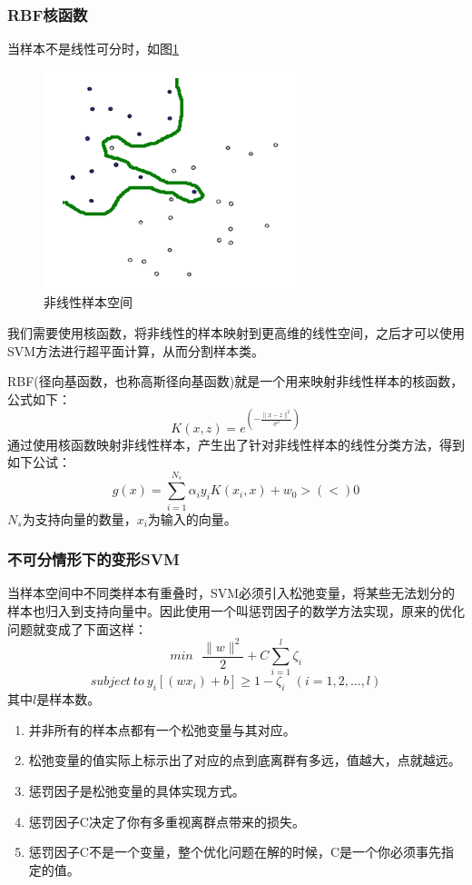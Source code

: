 \documentclass[UTF8, twocolumn ]{ctexart}
\begin{document}
\subsubsection{RBF核函数}
当样本不是线性可分时，如图\ref{fig:no8}
\begin{figure}[!ht]\centering
  \includegraphics[keepaspectratio, scale=1]{no8.png}
  \caption{非线性样本空间\label{fig:no8}} 
\end{figure}
我们需要使用核函数，将非线性的样本映射到更高维的线性空间，之后才可以使用SVM方法进行超平面计算，从而分割样本类。
\par
RBF(径向基函数，也称高斯径向基函数)就是一个用来映射非线性样本的核函数，公式如下：
\begin{equation}
  K(x,z)=e^{\left(-\frac{\|x-z\|^{2}}{\sigma^{2}}\right)}
\end{equation}
通过使用核函数映射非线性样本，产生出了针对非线性样本的线性分类方法，得到如下公试：
\begin{equation}
  g(x)=\sum_{i=1}^{N_{s}}\alpha_{i}y_{i}K(x_{i},x)+w_{0}>(<)0
\end{equation}
$N_{s}$为支持向量的数量，$x_{i}$为输入的向量。

\subsubsection{不可分情形下的变形SVM}
当样本空间中不同类样本有重叠时，SVM必须引入松弛变量，将某些无法划分的样本也归入到支持向量中。因此使用一个叫惩罚因子的数学方法实现，原来的优化问题就变成了下面这样：
\begin{equation}
  min \ \ \ \frac{\|w\|^{2}}{2}+C\sum_{i=1}^{l}\zeta_{i}
\end{equation}
\begin{equation}
  subject\ to\ y_{i}[(wx_{i})+b]\geqslant1-\zeta_{i}\ \ \ (i=1,2,...,l)
\end{equation}
其中$l$是样本数。
\begin{enumerate}
\item 并非所有的样本点都有一个松弛变量与其对应。
\item 松弛变量的值实际上标示出了对应的点到底离群有多远，值越大，点就越远。
\item 惩罚因子是松弛变量的具体实现方式。
\item 惩罚因子C决定了你有多重视离群点带来的损失。
\item 惩罚因子C不是一个变量，整个优化问题在解的时候，C是一个你必须事先指定的值。
\end{enumerate}
\end{document}
